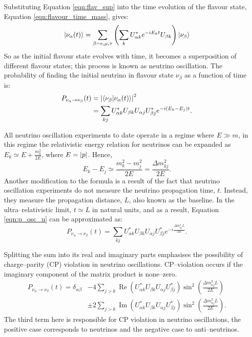Substituting Equation \ref{eqn:flav_sup} into the time evolution of the flavour
state, Equation \ref{eqn:flavour_time_mass}, gives:
\begin{equation*}
	\ket{\nu_\alpha(t)} = \sum_{\beta = e, \mu, \tau} \left(\sum_k
	U^*_{\alpha k} e^{-iE_kt} U_{\beta k} \right) \ket{\nu_{\beta}} 
\end{equation*}
So as the initial flavour state evolves with time, it becomes a superposition 
of different flavour states; this process is known as neutrino oscillation.
The probability of finding the initial neutrino in flavour state \(\nu_\beta\) 
as a function of time is:
\begin{align}
	\label{eqn:p_osc_u}
	P_{\nu_\alpha \rightarrow \nu_\beta}(t) &= \abs{\braket{\nu_\beta}{\nu_\alpha(t)}}^2 \nonumber \\
	                                        &= \sum_{kj} U^*_{\alpha k} U_{\beta k} U_{\alpha j} U^*_{\beta j} e^{-i(E_k - E_j)t}.
\end{align}

All neutrino oscillation experiments to date operate in a regime where 
\(E \gg m\), in this regime the relativistic energy relation for neutrinos can 
be expanded as \({E_k \simeq E + \frac{m_k^2}{2E}}\), where \(E = \abs{p}\). 
Hence, 
\begin{equation*}
	E_k - E_j \simeq \frac{m_k^2 - m_j^2}{2E} = \frac{\Delta m_{kj}^2}{2E}.
\end{equation*}
Another modification to the formula is a result of the fact that neutrino 
oscillation experiments do not measure the neutrino propagation time, \(t\). 
Instead, they measure the propagation distance, \(L\), also known as the 
baseline. In the ultra--relativistic limit, \({t \simeq L}\) in natural units,
and as a result, Equation \ref{eqn:p_osc_u} can be approximated as:
\begin{equation*}
	P_{\nu_\alpha \rightarrow \nu_\beta}(t) = \sum_{kj} U^*_{\alpha k} U_{\beta k} U_{\alpha j} U^*_{\beta j} e^{-i\frac{\Delta m^2_{kj}L}{2E}}.
\end{equation*}

Splitting the sum into its real and imaginary parts emphasises the possibility
of charge--parity (CP) violation in neutrino oscillations. CP--violation occurs if the imaginary
component of the matrix product is none--zero. 
\begin{align*}
	P_{\nu_\alpha \rightarrow \nu_\beta}(t) = \delta_{\alpha \beta} 
	&- 4 \sum_{j > k} \operatorname{Re}(U^*_{\alpha k} U_{\beta k} U_{\alpha j} U^*_{\beta j}) \sin^2(\frac{\Delta m^2_{kj} L}{2E}) \nonumber \\
	&\pm 2 \sum_{j > k} \operatorname{Im}(U^*_{\alpha k} U_{\beta k} U_{\alpha j} U^*_{\beta j}) \sin^2(\frac{\Delta m^2_{kj} L}{2E}).
\end{align*}
The third term here is responsible for CP violation in neutrino oscillations,
the positive case corresponds to neutrinos and the negative case to
anti--neutrinos.


